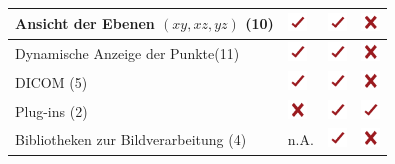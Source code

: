 \begin{table}
\begin{tabularx}{\textwidth}{|p{7cm}|X|X|X|}
    Ansicht der Ebenen  $(xy, xz, yz)$ (10)			& \includegraphics[width=0.5cm]{./img/yes.pdf} & \includegraphics[width=0.5cm]{./img/yes.pdf} & \includegraphics[width=0.5cm]{./img/no.pdf} \\ \hline
    Dynamische Anzeige der Punkte(11)	&\includegraphics[width=0.5cm]{./img/yes.pdf} & \includegraphics[width=0.5cm]{./img/yes.pdf}  & \includegraphics[width=0.5cm]{./img/no.pdf}\\ \hline
    DICOM (5)									    & \includegraphics[width=0.5cm]{./img/yes.pdf}	& \includegraphics[width=0.5cm]{./img/yes.pdf}	& \includegraphics[width=0.5cm]{./img/no.pdf}\\ \hline	
    Plug-ins (2)		 							& \includegraphics[width=0.5cm]{./img/no.pdf}	& \includegraphics[width=0.5cm]{./img/yes.pdf} 	& \includegraphics[width=0.5cm]{./img/yes.pdf}  \\ \hline
    Bibliotheken zur Bildverarbeitung (4)		 	& n.A.			& \includegraphics[width=0.5cm]{./img/yes.pdf}  		  		& \includegraphics[width=0.5cm]{./img/no.pdf}  \\ \hline

\end{tabularx}
\end{table}
